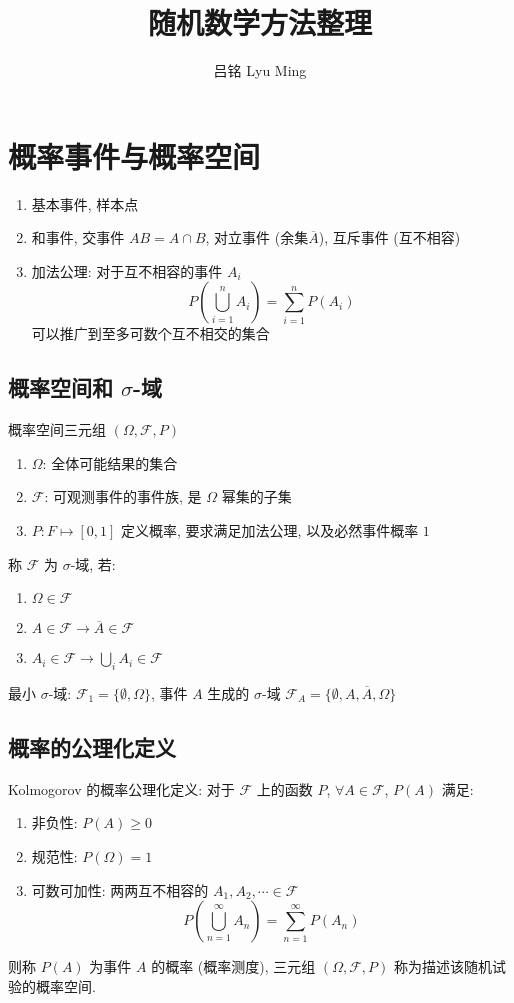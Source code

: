 \documentclass[11pt,a4paper,twocolumn]{article} %
\numberwithin{equation}{section} %
\begin{document}
\title{随机数学方法整理}
\author{吕铭 Lyu Ming}
\maketitle
\tableofcontents
\newpage
\section{概率事件与概率空间} %
\label{sec:overall_defs}
\begin{enumerate}
	\item 基本事件, 样本点
	\item 和事件, 交事件 $AB = A\cap B$, 对立事件 (余集$\overline A$), 
	互斥事件 (互不相容)
	\item 加法公理: 对于互不相容的事件 $A_i$
	\begin{equation}
		P\left(\bigcup_{i=1}^{n} A_i\right) = \sum_{i=1}^{n} P(A_i)
	\end{equation}
	可以推广到至多可数个互不相交的集合
\end{enumerate}
\subsection[概率空间和 sigma-域]{概率空间和 $\sigma$-域} %
\label{sub:probability_space}
概率空间三元组 $(\Omega, \mathscr F, P)$
\begin{enumerate}
	\item $\Omega$: 全体可能结果的集合
	\item $\mathscr F$: 可观测事件的事件族, 是 $\Omega$ 幂集的子集
	\item $P: F\mapsto [0,1]$ 定义概率, 要求满足加法公理, 以及必然事件概率 $1$
\end{enumerate}
称 $\mathscr F$ 为 $\sigma$-域, 若: 
\begin{enumerate}
	\item $\Omega\in\mathscr F$
	\item $A\in\mathscr F \to \overline A\in\mathscr F$
	\item $A_i\in\mathscr F \to \bigcup_i A_i \in \mathscr F$
\end{enumerate}
最小 $\sigma$-域: $\mathscr F_1 = \{\emptyset, \Omega\}$, 
事件 $A$ 生成的 $\sigma$-域 $\mathscr F_A = \{\emptyset, A, \overline A, \Omega\}$
\subsection{概率的公理化定义} %
\label{sub:axiom_probability}
Kolmogorov 的概率公理化定义: 对于 $\mathscr F$ 上的函数 $P$, 
$\forall A\in \mathscr F$, $P(A)$ 满足: 
\begin{enumerate}
	\item 非负性: $P(A) \ge 0$
	\item 规范性: $P(\Omega) = 1$
	\item 可数可加性: 两两互不相容的 $A_1, A_2, \cdots \in \mathscr F$
	\begin{equation}
		P\left(\bigcup_{n=1}^{\infty} A_n\right) = \sum_{n=1}^\infty P(A_n)
	\end{equation}
\end{enumerate}
则称 $P(A)$ 为事件 $A$ 的概率 (概率测度), 
三元组 $(\Omega, \mathscr F, P)$ 称为描述该随机试验的概率空间. 
\end{document}
